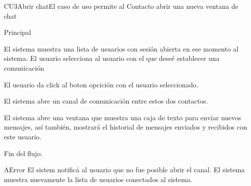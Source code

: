 
% 



	

	\begin{UseCase}{CU3}{Abrir chat}{El caso de uso permite al Contacto abrir una nueva ventana de chat}
	\end{UseCase}

	\begin{UCtrayectoria}{Principal}
	
		\UCpaso  El sistema muestra una lista de usuarios con sesi\'on abierta en ese momento al sistema.
		\UCpaso[\UCactor] El usuario selecciona al usuario con el que dese\'e establecer una comunicaci\'on

		\UCpaso[\UCactor]  El usuario da click al boton opcici\'on  con el usuario seleccionado.
		
		\UCpaso El sistema abre un canal de comunicaci\'on entre estos dos contactos.

		\UCpaso El sistema abre una ventana que muestra una caja de texto para enviar nuevos mensajes, as\'i tambi\'en, mostrar\'a el historial de mensajes enviados y recibidos con este usuario.

		\UCpaso[] Fin del flujo.
				
	\end{UCtrayectoria}
		
		\begin{UCtrayectoriaA}{A}{Error}
			\UCpaso El sistem notific\'a al usuario que no fue posible abrir el canal.
			\UCpaso El sistema muestra nuevamente la lista de usuarios conectados al sistema.
		\end{UCtrayectoriaA}
		
		
